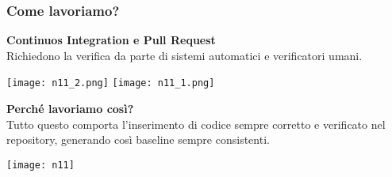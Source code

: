 \begin{frame}
\frametitle{Come lavoriamo?}
  	\textbf{Continuos Integration e Pull Request}\\
  	Richiedono la verifica da parte di sistemi automatici e verificatori umani.\\
	\begin{flushright}
		\texttt{[image: n11\_2.png]}	 	
  		\texttt{[image: n11\_1.png]}
	\end{flushright}
  	\par \textbf{Perché lavoriamo così?}\\ 
  	Tutto questo comporta l’inserimento di codice
sempre corretto e verificato nel repository, generando così baseline sempre consistenti.
	\begin{flushright}
		\texttt{[image: n11]}
	\end{flushright}
\end{frame}



